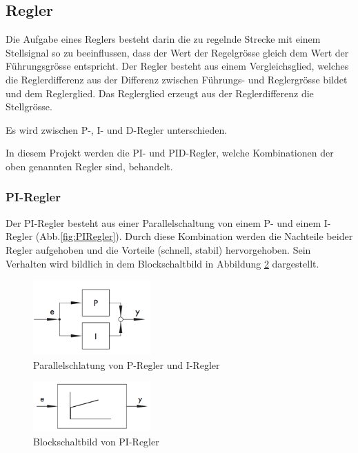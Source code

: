 \subsection{Regler}
Die Aufgabe  eines Reglers  besteht darin  die zu  regelnde Strecke  mit einem
Stellsignal  so  zu  beeinflussen,  dass der  Wert  der  Regelgr\"osse  gleich
dem  Wert  der F\"uhrungsgr\"osse  entspricht. Der  Regler  besteht aus  einem
Vergleichsglied,  welches  die  Reglerdifferenz  aus  der  Differenz  zwischen
F\"uhrungs-  und Reglergr\"osse  bildet und  dem Reglerglied. Das  Reglerglied
erzeugt aus der Reglerdifferenz die Stellgr\"osse.

Es wird zwischen P-, I- und D-Regler unterschieden.

In diesem Projekt werden die PI- und PID-Regler, welche Kombinationen der oben
genannten Regler sind, behandelt.

\subsubsection{PI-Regler}
Der  PI-Regler   besteht  aus  einer   Parallelschaltung  von  einem   P-  und
einem  I-Regler (Abb.\ref{fig:PIRegler}). Durch  diese Kombination  werden die
Nachteile  beider  Regler  aufgehoben   und  die  Vorteile  (schnell,  stabil)
hervorgehoben. Sein  Verhalten   wird  bildlich  in  dem   Blockschaltbild  in
Abbildung \ref{fig:PIRegler2} dargestellt.

\begin{figure}[h!, width=\pagewidth]
    \centering
    \includegraphics[width=0.4\textwidth]{images/PIRegler1}
    \caption{Parallelschlatung von P-Regler und I-Regler}
    \label{fig:PIRegler1}
\end{figure}

\begin{figure}[h!, width=\pagewidth]
    \centering
    \includegraphics[width=0.4\textwidth]{images/PIRegler2}
    \caption{Blockschaltbild von PI-Regler}
    \label{fig:PIRegler2}
\end{figure}


